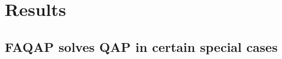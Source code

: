 \documentclass[10pt,journal,cspaper,compsoc]{IEEEtran}
\begin{document}




% 



\section{Results} %
\label{sec:theoretical_results}


\subsection{FAQAP solves QAP in certain special cases} %
\label{sub:rqap_solves_qap_}
\end{document}
